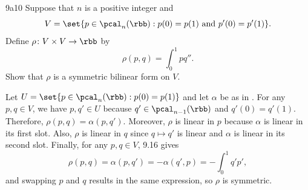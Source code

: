 \begin{exercise}{9a10}
    Suppose that $n$ is a positive integer and
    \[
        V = \set{p \in \pcal_n(\rbb) : p(0) = p(1) \text{ and } p'(0) = p'(1)}.
    \]
    Define $\rho \colon V \times V \to \rbb$ by
    \[
        \rho(p, q) = \int_0^1 pq''.
    \]
    Show that $\rho$ is a symmetric bilinear form on $V$.
\end{exercise}

\begin{sol}
    Let $U = \set{p \in \pcal_n(\rbb) : p(0) = p(1)}$ and let $\alpha$ be as in .
    For any $p, q \in V$, we have $p, q' \in U$ because $q' \in \pcal_{n-1}(\rbb)$ and $q'(0) = q'(1)$.
    Therefore, $\rho(p, q) = \alpha(p, q')$.
    Moreover, $\rho$ is linear in $p$ because $\alpha$ is linear in its first slot.
    Also, $\rho$ is linear in $q$ since $q \mapsto q'$ is linear and $\alpha$ is linear in its second slot.
    Finally, for any $p, q \in V$, 9.16 gives
    \[
        \rho(p, q) = \alpha(p, q') = -\alpha(q', p) = -\int_0^1 q' p',
    \]
    and swapping $p$ and $q$ results in the same expression, so $\rho$ is symmetric.
\end{sol}